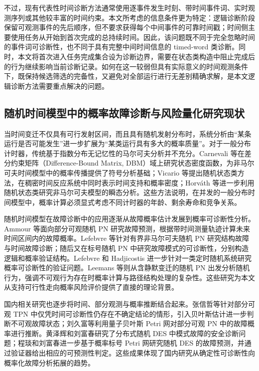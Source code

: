 \documentclass[master,fontset=ubuntu]{shnuthesis}
\theoremstyle{definition}
\begin{document}
不过，现有代表性时间诊断方法通常使用逐事件发生时刻、带时间事件词、实时观测序列或其他较丰富的时间约束。本文所考虑的信息条件更为特定：逻辑诊断阶段保留可观测事件的先后顺序，但不要求获得每个中间事件的可靠时间戳；时间侧主要使用任务从开始到首次完成的总持续时间。因此，该问题既不同于完全忽略时间的事件词可诊断性，也不同于具有完整中间时间信息的 timed-word 类诊断。同时，本文将首次进入任务完成集合设为诊断边界，需要在状态类构造中阻止完成后的行为继续影响当前诊断记录。如何在这一较弱但具有实际意义的时间观测条件下，既保持候选筛选的完备性，又避免对全部运行进行无差别精确求解，是本文逻辑诊断方法需要重点解决的问题。

\subsection{随机时间模型中的概率故障诊断与风险量化研究现状}

当时间变迁不仅具有可行发射区间，而且具有随机发射分布时，系统分析由“某条运行是否可能发生”进一步扩展为“某类运行具有多大的概率质量”。对于一般分布计时器，传统基于指数分布无记忆性的马尔可夫分析并不充分。Carnevali 等在差分约束矩阵（Difference-Bound Matrix, DBM）域上研究状态密度函数，为非马尔可夫时间模型中的概率传播提供了符号分析基础\cite{Carnevali2009}；Vicario 等提出随机状态类方法，在稠密时间反应系统中同时表示时间支持和概率密度\cite{Vicario2009}；Horv\'ath 等进一步利用随机状态类研究非马尔可夫模型的瞬态分析\cite{Horvath2012}。这些方法说明，在并发的一般分布时间模型中，概率计算必须显式考虑不同计时器的年龄、剩余寿命和竞争关系。

随机时间模型在故障诊断中的应用逐渐从故障概率估计发展到概率可诊断性分析。Ammour 等面向部分可观随机 PN 研究故障预测，根据带时间测量轨迹计算未来时间区间内的故障概率\cite{Ammour2018}。Lefebvre 等针对有界非马尔可夫随机 PN 研究结构故障与时间故障诊断\cite{Lefebvre2020}；随后又在标号随机 PN 中研究故障模式的可诊断性，分别构造逻辑和概率验证结构\cite{Lefebvre2022}。Lefebvre 和 Hadjicostis 进一步针对一类定时随机系统研究概率可诊断性的验证问题\cite{Lefebvre2023}。Leemans 等则从含静默变迁的随机 PN 出发分析随机行为，强调不可观行为存在时概率计算与路径结构处理的复杂性\cite{Leemans2024}。这些研究为本文从支持可行性走向概率风险评价提供了直接的理论背景。

国内相关研究也逐步将时间、部分观测与概率推断结合起来。张信哲等针对部分可观 TPN 中仅凭时间可诊断性仍存在不确定结论的情形，引入贝叶斯估计进一步判断不可观故障状态\cite{Zhang2020}；刘久富等利用量子贝叶斯 Petri 网对部分可观 PN 中的故障概率进行推断\cite{LiuQuantum2022}。黄泽辉和刘富春研究了分布式随机 DES 中模式故障的安全诊断问题\cite{Huang2024}；程琰和刘富春进一步基于概率标号 Petri 网研究随机 DES 的故障预测，并通过验证器给出相应的可预测性判定\cite{Cheng2025}。这些成果体现了国内研究从确定性可诊断性向概率化故障分析拓展的趋势。
\end{document}
